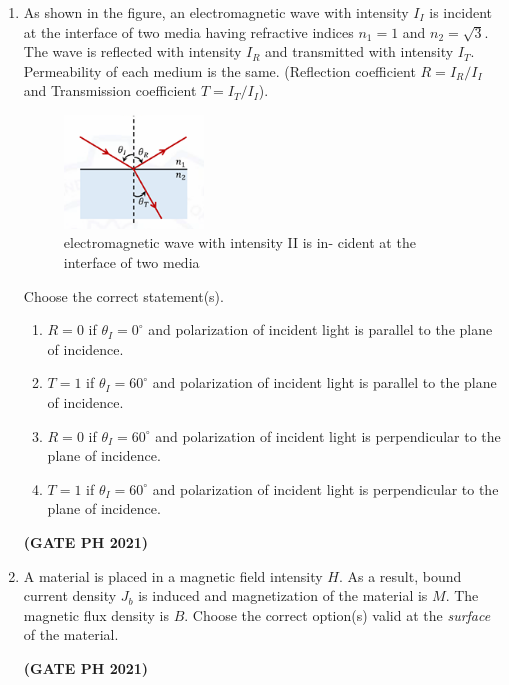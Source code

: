 \documentclass[14pt, a4paper]{extarticle}
\begin{document}
\begin{enumerate}[label=\textbf{Q.\arabic*}]
\begin{enumerate}[label=\textbf{Q.\arabic*}]
\item As shown in the figure, an electromagnetic wave with intensity $I_I$ is incident at the interface of two media having refractive indices $n_1 = 1$ and $n_2 = \sqrt{3}$. The wave is reflected with intensity $I_R$ and transmitted with intensity $I_T$. Permeability of each medium is the same. (Reflection coefficient $R = I_R/I_I$ and Transmission coefficient $T = I_T/I_I$).
\begin{figure}[H]
\centering
\includegraphics[width=0.35\textwidth]{figs/q21fig21.png}
\caption{electromagnetic wave with intensity II is in-
cident at the interface of two media}
\end{figure}
Choose the correct statement(s).
\begin{enumerate}
\item $R=0$ if $\theta_I = 0^{\circ}$ and polarization of incident light is parallel to the plane of incidence.
\item $T=1$ if $\theta_I = 60^{\circ}$ and polarization of incident light is parallel to the plane of incidence.
\item $R=0$ if $\theta_I = 60^{\circ}$ and polarization of incident light is perpendicular to the plane of incidence.
\item $T=1$ if $\theta_I = 60^{\circ}$ and polarization of incident light is perpendicular to the plane of incidence.
\end{enumerate}
\hfill \textbf{(GATE PH 2021)}

\item A material is placed in a magnetic field intensity $H$. As a result, bound current density $J_b$ is induced and magnetization of the material is $M$. The magnetic flux density is $B$. Choose the correct option(s) valid at the \textit{surface} of the material.
\begin{enumerate}
\end{enumerate}
\hfill \textbf{(GATE PH 2021)}


\end{enumerate}
\end{enumerate}
\end{document}
